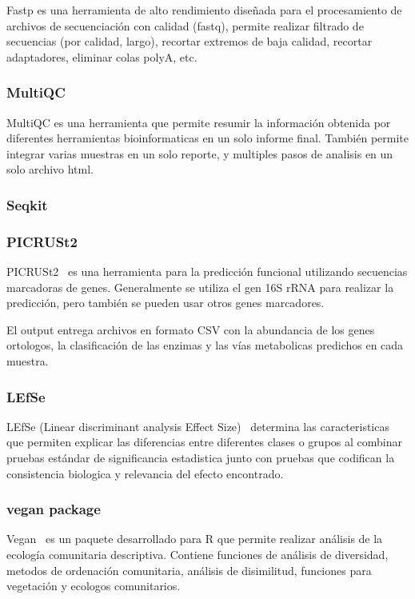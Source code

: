 Fastp\cite{chen2018fastp} es una herramienta de alto rendimiento diseñada para el procesamiento de archivos de secuenciación con calidad (fastq), permite realizar filtrado de secuencias (por calidad, largo), recortar extremos de baja calidad, recortar adaptadores, eliminar colas polyA, etc.
\subsubsection{MultiQC}
MultiQC \cite{ewels2016multiqc} es una herramienta que permite resumir la información obtenida por diferentes herramientas bioinformaticas en un solo informe final. También permite integrar varias muestras en un solo reporte, y multiples pasos de analisis en un solo archivo html.


\subsubsection{Seqkit}

\subsubsection{PICRUSt2}
PICRUSt2~\cite{douglas2020picrust2} es una herramienta para la predicción funcional utilizando secuencias marcadoras de genes.
Generalmente se utiliza el gen 16S rRNA para realizar la predicción, pero también se pueden usar otros genes marcadores.

El output entrega archivos en formato CSV con la abundancia de los genes ortologos, la clasificación de las enzimas y las vías metabolicas predichos en cada muestra.

\subsubsection{LEfSe}
LEfSe (Linear discriminant analysis Effect Size)~\cite{segata2011metagenomic}  determina las caracteristicas que permiten explicar las diferencias entre diferentes clases o grupos al combinar pruebas estándar de significancia estadistica junto con pruebas que codifican la consistencia biologica y relevancia del efecto encontrado. 
\subsubsection{vegan package}
Vegan~\cite{dixon2003vegan} es un paquete desarrollado para R que permite realizar análisis de la ecología comunitaria descriptiva. Contiene funciones de análisis de diversidad,  metodos de ordenación comunitaria, análisis de disimilitud, funciones para vegetación y ecologos comunitarios.

